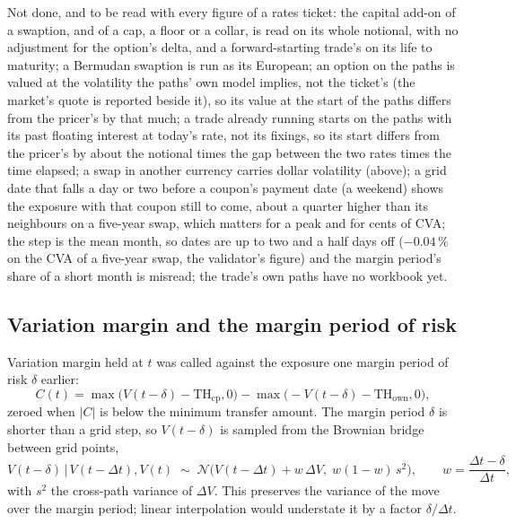 \documentclass[11pt,a4paper]{article}
\newcommand{\N}{\mathcal{N}}
\let\plainsubsection\subsection
\renewcommand{\subsection}{\needspace{5\baselineskip}\plainsubsection}
\begin{document}
Not done, and to be read with every figure of a rates ticket: the capital add-on of a swaption, and of a cap, a floor or a collar, is read on its whole notional, with no adjustment for the option's delta, and a forward-starting trade's on its life to maturity; a Bermudan swaption is run as its European; an option on the paths is valued at the volatility the paths' own model implies, not the ticket's (the market's quote is reported beside it), so its value at the start of the paths differs from the pricer's by that much; a trade already running starts on the paths with its past floating interest at today's rate, not its fixings, so its start differs from the pricer's by about the notional times the gap between the two rates times the time elapsed; a swap in another currency carries dollar volatility (above); a grid date that falls a day or two before a coupon's payment date (a weekend) shows the exposure with that coupon still to come, about a quarter higher than its neighbours on a five-year swap, which matters for a peak and for cents of CVA; the step is the mean month, so dates are up to two and a half days off ($-0.04\,\%$ on the CVA of a five-year swap, the validator's figure) and the margin period's share of a short month is misread; the trade's own paths have no workbook yet.

\subsection{Variation margin and the margin period of risk}
Variation margin held at $t$ was called against the exposure one margin period of risk $\delta$ earlier:
\begin{equation}
C(t) = \max\big(V(t-\delta)-\mathrm{TH}_{\mathrm{cp}},0\big) - \max\big(-V(t-\delta)-\mathrm{TH}_{\mathrm{own}},0\big),
\end{equation}
zeroed when $|C|$ is below the minimum transfer amount. The margin period $\delta$ is shorter than a grid step, so $V(t-\delta)$ is sampled from the Brownian bridge between grid points,
\begin{equation}
V(t-\delta)\,\big|\,V(t-\Delta t),V(t)\;\sim\;\N\!\big(V(t-\Delta t)+w\,\Delta V,\;w(1-w)\,s^2\big),\qquad w=\frac{\Delta t-\delta}{\Delta t},
\end{equation}
with $s^2$ the cross-path variance of $\Delta V$. This preserves the variance of the move over the margin period; linear interpolation would understate it by a factor $\delta/\Delta t$.
\end{document}
